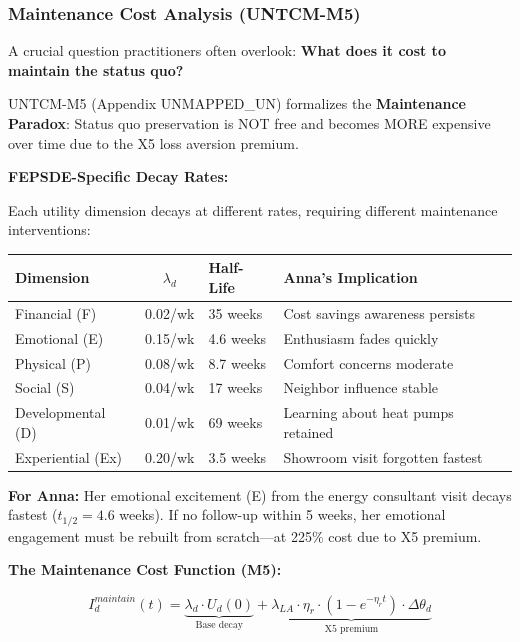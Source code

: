 \subsubsection{Maintenance Cost Analysis (UNTCM-M5)}

A crucial question practitioners often overlook: \textbf{What does it cost to maintain the status quo?}

UNTCM-M5 (Appendix UNMAPPED_UN) formalizes the \textbf{Maintenance Paradox}: Status quo preservation is NOT free and becomes MORE expensive over time due to the X5 loss aversion premium.

\textbf{FEPSDE-Specific Decay Rates:}

Each utility dimension decays at different rates, requiring different maintenance interventions:

\begin{center}
\renewcommand{\arraystretch}{1.2}
\begin{tabular}{@{}lcll@{}}
\toprule
\textbf{Dimension} & \textbf{$\lambda_d$} & \textbf{Half-Life} & \textbf{Anna's Implication} \\
\midrule
Financial (F) & 0.02/wk & 35 weeks & Cost savings awareness persists \\
Emotional (E) & 0.15/wk & 4.6 weeks & Enthusiasm fades quickly \\
Physical (P) & 0.08/wk & 8.7 weeks & Comfort concerns moderate \\
Social (S) & 0.04/wk & 17 weeks & Neighbor influence stable \\
Developmental (D) & 0.01/wk & 69 weeks & Learning about heat pumps retained \\
Experiential (Ex) & 0.20/wk & 3.5 weeks & Showroom visit forgotten fastest \\
\bottomrule
\end{tabular}
\end{center}

\textbf{For Anna:} Her emotional excitement (E) from the energy consultant visit decays fastest ($t_{1/2} = 4.6$ weeks). If no follow-up within 5 weeks, her emotional engagement must be rebuilt from scratch---at 225\% cost due to X5 premium.

\textbf{The Maintenance Cost Function (M5):}

\begin{equation}
I_d^{maintain}(t) = \underbrace{\lambda_d \cdot U_d(0)}_{\text{Base decay}} + \underbrace{\lambda_{LA} \cdot \eta_r \cdot (1 - e^{-\eta_r t}) \cdot \Delta\theta_d}_{\text{X5 premium}}
\end{equation}

